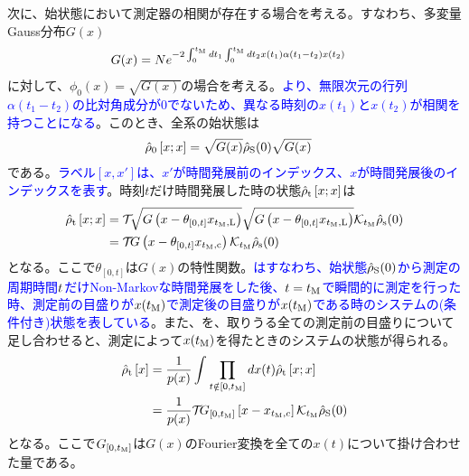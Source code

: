 \documentclass[10pt, a4paper]{jsarticle}
\begin{document}
次に、始状態において測定器の相関が存在する場合を考える。すなわち、多変量Gauss分布$G(x)$
\begin{equation}
\begin{split}
\label{eq:231}
	 G(x) &= N e^{- 2 \int_{0}^{t_{\rm M}} dt_{1} \int_{0}^{t_{\rm M}} dt_{2} x(t_{1}) \alpha\left( t_{1} - t_{2} \right) x(t_{2})}
\end{split}
\end{equation}
に対して、$\phi_{0}(x) = \sqrt{G(x)}$の場合を考える。\textcolor{blue}{より、無限次元の行列$\alpha\left( t_{1} - t_{2} \right)$の比対角成分が0でないため、異なる時刻の$x(t_{1})$と$x(t_{2})$が相関を持つことになる}。このとき、全系の始状態は
\textcolor{red}{
\begin{equation}
\begin{split}
\label{eq:232}
	\hat{\rho}_{\rm 0} \left[ x; x \right] &= \sqrt{G(x)} \hat{\rho}_{\rm S}(0) \sqrt{G(x)}
\end{split}
\end{equation}
}
である。\textcolor{blue}{ラベル$\left[ x, x' \right]$は、$x'$が時間発展前のインデックス、$x$が時間発展後のインデックスを表す}。時刻$t$だけ時間発展した時の状態$\hat{\rho}_{\rm t} \left[ x; x \right]$は
\textcolor{red}{
\begin{equation}
\begin{split}
\label{eq:233}
	\hat{\rho}_{\rm t} \left[ x; x \right] &= \mathcal{T}_{} \sqrt{G\left( x - \theta_{[0, t]} x_{t_{\rm M}, {\rm L}} \right)} \sqrt{G\left( x - \theta_{[0, t]} x_{t_{\rm M}, {\rm L}} \right)} \mathcal{K}_{t_{\rm M}} \hat{\rho}_{\rm s}(0) \\
		&= \mathcal{T}_{} G\left( x - \theta_{[0, t]} x_{t_{\rm M}, {\rm c}} \right) \mathcal{K}_{t_{\rm M}} \hat{\rho}_{\rm s}(0)
\end{split}
\end{equation}
}
となる。ここで$\theta_{[0, t]}$は$G(x)$の特性関数。\textcolor{blue}{はすなわち、始状態$\hat{\rho}_{\rm S}(0)$から測定の周期時間$t_{\rm}$だけNon-Markovな時間発展をした後、$t = t_{\rm M}$で瞬間的に測定を行った時、測定前の目盛りが$x(t_{\rm M})$で測定後の目盛りが$x(t_{\rm M})$である時のシステムの(条件付き)状態を表している}。また、を、取りうる全ての測定前の目盛りについて足し合わせると、測定によって$x(t_{\rm M})$を得たときのシステムの状態が得られる。
\textcolor{red}{
\begin{equation}
\begin{split}
\label{eq:234}
	\hat{\rho}_{\rm t} \left[ x \right] &= \dfrac{1}{p(x)} \int_{}^{} \prod_{t \notin \left[ 0, t_{\rm M} \right]} dx(t) \hat{\rho}_{\rm t} \left[ x; x \right] \\
		&= \dfrac{1}{p(x)} \mathcal{T}_{} G_{\left[ 0, t_{\rm M} \right]} \left[ x - x_{t_{\rm M}, c} \right] \mathcal{K}_{t_{\rm M}} \hat{\rho}_{\rm S}(0)
\end{split}
\end{equation}
}
となる。ここで$G_{\left[ 0, t_{\rm M} \right]}$は$G(x)$のFourier変換を全ての$x(t)$について掛け合わせた量である。
\end{document}
